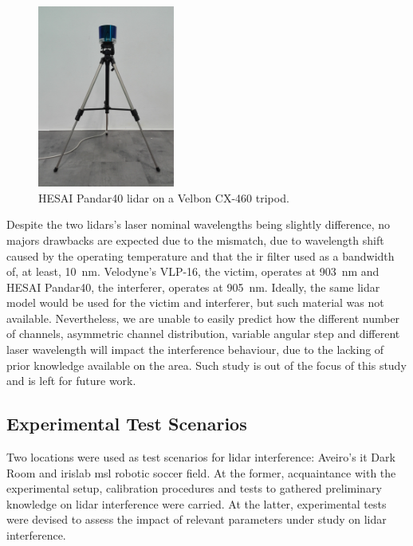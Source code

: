 \begin{figure}[!ht]
\centering
\includegraphics[width=0.4\textwidth]{img/experimental-setup/pandar40-on-tripod.jpg}
\caption[HESAI Pandar40 \ac{lidar} on a Velbon CX-460 tripod.]{HESAI Pandar40 \ac{lidar} on a Velbon CX-460 tripod.}
\label{fig:pandar40-on-tripod}
\end{figure}

Despite the two \acp{lidar}'s laser nominal wavelengths being slightly difference, no majors drawbacks are expected due to the mismatch, due to wavelength shift caused by the operating temperature and that the \ac{ir} filter used as a bandwidth of, at least, \SI{10}{\nano\meter}. Velodyne's VLP-16, the victim, operates at \SI{903}{\nano\meter} and HESAI Pandar40, the interferer, operates at \SI{905}{\nano\meter}. Ideally, the same \ac{lidar} model would be used for the victim and interferer, but such material was not available. Nevertheless, we are unable to easily predict how the different number of channels, asymmetric channel distribution, variable angular step and different laser wavelength will impact the interference behaviour, due to the lacking of prior knowledge available on the area. Such study is out of the focus of this study and is left for future work.

\subsection{Experimental Test Scenarios}
\label{subsec:lidar-interference:test-scenarios}

Two locations were used as test scenarios for \ac{lidar} interference: Aveiro's \ac{it} Dark Room and \ac{irislab} \ac{msl} robotic soccer field. At the former, acquaintance with the experimental setup, calibration procedures and tests to gathered preliminary knowledge on \ac{lidar} interference were carried. At the latter, experimental tests were devised to assess the impact of relevant parameters under study on \ac{lidar} interference. 

